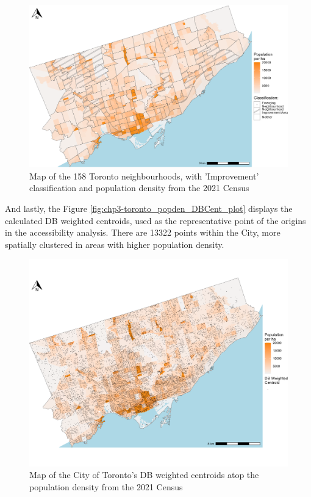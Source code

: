 \documentclass[
11pt, %
oneside, %
english, %
singlespacing, %
]{macthesis} %
\begin{document}
\begin{figure}

{\centering \includegraphics[width=6in]{./data/figures/chp3-toronto_popden_NIAs_plot} 

}

\caption{\label{fig:chp3-toronto_popden_NIAs_plot}Map of the 158 Toronto neighbourhoods, with 'Improvement' classification and population density from the 2021 Census}\label{fig:unnamed-chunk-44}
\end{figure}

And lastly, the Figure \ref{fig:chp3-toronto_popden_DBCent_plot} displays the calculated DB weighted centroids, used as the representative point of the origins in the accessibility analysis. There are 13322 points within the City, more spatially clustered in areas with higher population density.

\begin{figure}

{\centering \includegraphics[width=6in]{./data/figures/chp3-toronto_popden_DBCent_plot} 

}

\caption{\label{fig:chp3-toronto_popden_DBCent_plot}Map of the City of Toronto's DB weighted centroids atop the population density from the 2021 Census}\label{fig:unnamed-chunk-45}
\end{figure}
\end{document}
